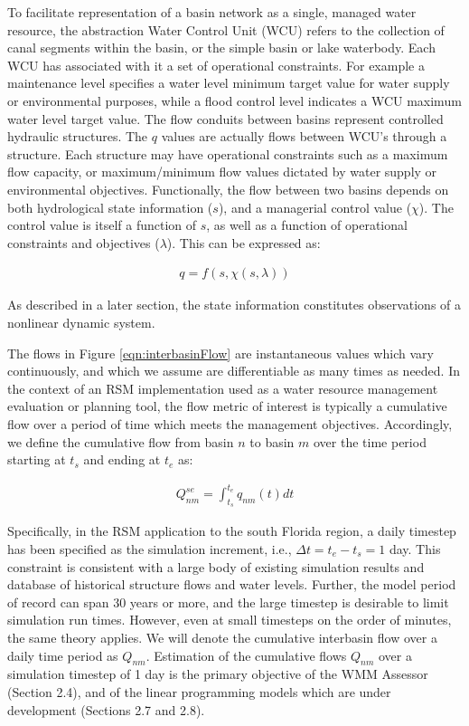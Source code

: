 To facilitate representation of a basin network as a single, managed
water resource, the abstraction Water Control Unit (WCU) refers to the
collection of canal segments within the basin, or the simple basin or
lake waterbody. Each WCU has associated with it a set of operational
constraints. For example a maintenance level specifies a water level
minimum target value for water supply or environmental purposes, while
a flood control level indicates a WCU maximum water level target
value. The flow conduits between basins represent controlled hydraulic
structures. The $q$ values are actually flows between WCU's through a
structure. Each structure may have operational constraints such as a
maximum flow capacity, or maximum/minimum flow values dictated by
water supply or environmental objectives. Functionally, the flow
between two basins depends on both hydrological state information ($s$),
and a managerial control value ($\chi$). The control value is itself a
function of $s$, as well as a function of operational constraints and
objectives ($\lambda$). This can be expressed as:

\begin{align}\label{eqn:interbasinFlow}
 q = f(s,\chi(s,\lambda))
\end{align}

As described in a later section, the state information constitutes
observations of a nonlinear dynamic system.

The flows in Figure \ref{eqn:interbasinFlow} are instantaneous values
which vary continuously, and which we assume are differentiable as
many times as needed. In the context of an RSM implementation used as
a water resource management evaluation or planning tool, the flow
metric of interest is typically a cumulative flow over a period of
time which meets the management objectives. Accordingly, we define the
cumulative flow from basin $n$ to basin $m$ over the time period starting
at $t_s$ and ending at $t_e$ as:

\begin{align}\label{eqn:CumBasintoBasin}
  Q^{se}_{nm} = \int_{t_s}^{t_e}q_{nm}(t)dt
\end{align}

Specifically, in the RSM application to the south Florida region, a
daily timestep has been specified as the simulation increment, i.e.,
$\Delta t = t_e - t_s = 1$ day. This constraint is consistent with a large body
of existing simulation results and database of historical structure
flows and water levels. Further, the model period of record can span
30 years or more, and the large timestep is desirable to limit
simulation run times. However, even at small timesteps on the order of
minutes, the same theory applies. We will denote the cumulative
interbasin flow over a daily time period as $Q_{nm}$. Estimation of the
cumulative flows $Q_{nm}$ over a simulation timestep of 1 day is the
primary objective of the WMM Assessor (Section 2.4), and of the linear
programming models which are under development (Sections 2.7 and 2.8).


